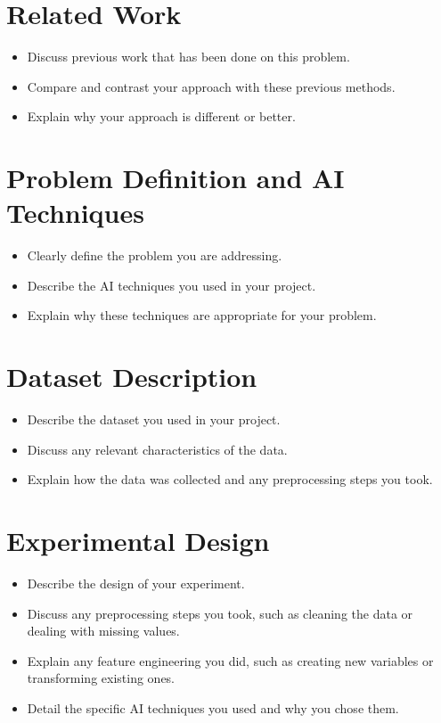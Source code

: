 \documentclass{article}
\begin{document}
\section{Related Work}
\begin{itemize}
    \item Discuss previous work that has been done on this problem.
    \item Compare and contrast your approach with these previous methods.
    \item Explain why your approach is different or better.
\end{itemize}

\section{Problem Definition and AI Techniques}
\begin{itemize}
    \item Clearly define the problem you are addressing.
    \item Describe the AI techniques you used in your project.
    \item Explain why these techniques are appropriate for your problem.
\end{itemize}

\section{Dataset Description}
\begin{itemize}
    \item Describe the dataset you used in your project.
    \item Discuss any relevant characteristics of the data.
    \item Explain how the data was collected and any preprocessing steps you
          took.
\end{itemize}

\section{Experimental Design}
\begin{itemize}
    \item Describe the design of your experiment.
    \item Discuss any preprocessing steps you took, such as cleaning the data
          or
          dealing with missing values.
    \item Explain any feature engineering you did, such as creating new
          variables
          or transforming existing ones.
    \item Detail the specific AI techniques you used and why you chose them.
\end{itemize}
\end{document}
